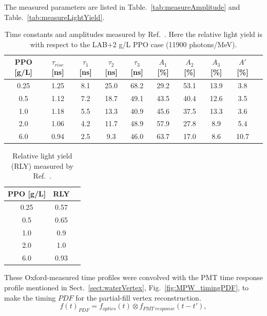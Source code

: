 The measured parameters are listed in Table.~\ref{tab:measureAmplitude} and Table.~\ref{tab:measureLightYield}.
\begin{table}[ht]
	\centering\label{tab:measureAmplitude}
	\caption{\label{oxfordMeasure} Time constants and amplitudes measured by Ref.~\cite{oxfordMeasurement}. Here the relative light yield is with respect to the LAB+2 g/L PPO case (11900 photons/MeV).}	
	{\centering
		\begin{tabular*}{160mm}{c@{\extracolsep{\fill}}ccccccccc}
			\toprule 
			PPO [g/L] & $\tau_{rise}$ [ns] & $\tau_1$ [ns] & $\tau_2$ [ns] & $\tau_3$ [ns] & $A_1$ [\%]  & $A_2$ [\%]   & $A_3$ [\%]  & $A'$ [\%] \\
			\midrule
			0.25 & 1.25 & 8.1 & 25.0 & 68.2 & 29.2 & 53.1 & 13.9 & 3.8\\
			0.5  & 1.12 & 7.2 & 18.7 & 49.1 & 43.5 & 40.4 & 12.6 & 3.5 \\
			1.0 & 1.18 & 5.5 & 13.3 & 40.9 & 45.6 & 37.5 & 13.3 & 3.6 \\
			2.0 & 1.06 & 4.2 & 11.7 & 48.9 & 57.9 & 27.8 & 8.9 & 5.4	\\
			6.0 & 0.94 & 2.5 & 9.3  & 46.0 & 63.7 & 17.0 & 8.6 & 10.7\\
			\bottomrule	
		\end{tabular*}
	}
\end{table}
\begin{table}[ht]
	\centering\label{tab:measureLightYield}
	\caption{\label{oxfordMeasure2}Relative light yield (RLY) measured by Ref.~\cite{oxfordMeasurement}.}	
	{\centering
		\begin{tabular*}{60mm}{c@{\extracolsep{\fill}}cc}
			\toprule 
			PPO [g/L] & RLY \\
			\midrule
			0.25 & 0.57\\
			0.5 & 0.65\\
			1.0 & 0.9\\
			2.0 & 1.0\\
			6.0 & 0.93\\
			\bottomrule	
		\end{tabular*}
	}
\end{table}
These Oxford-measured  time profiles were convolved with the PMT time response profile mentioned in Sect.~\ref{sect:waterVertex}, Fig.~\ref{fig:MPW_timingPDF}, to make the timing $PDF$ for the partial-fill vertex reconstruction. 
\begin{equation}\label{eq:OxfordTimingPDF}
f(t)_{PDF} = f_{optics}(t)\otimes f_{PMT~response}(t-t'),
\end{equation}

